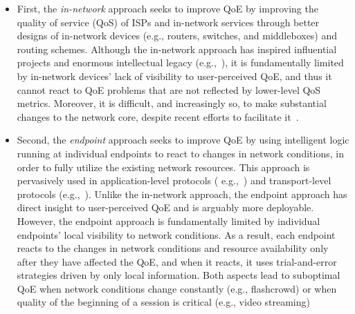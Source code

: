 \begin{itemize}
\item First, the {\em in-network} approach seeks to improve QoE by improving
the quality of service (QoS) of ISPs and in-network services through better designs 
of in-network devices (e.g., routers, switches, and middleboxes) and routing schemes.
Although the  in-network approach has inspired influential projects and 
enormous intellectual legacy (e.g.,~\cite{demers1989analysis,csfq,active-network,red,ecn,ccn}),
it is fundamentally limited by in-network devices' lack of visibility to user-perceived QoE,
and thus it cannot react to QoE problems that are not reflected by lower-level QoS metrics.
Moreover, it is difficult, and increasingly so, to make substantial changes 
to the network core, despite recent efforts to facilitate it~\cite{feamster2014road}.

\item Second, the {\em endpoint} approach seeks to improve QoE by using
intelligent logic running at individual endpoints to react to changes in
network conditions, in order to fully utilize the existing network resources.
This approach is pervasively used in application-level protocols (
e.g.,~\cite{dash,festive,butkiewicz2015klotski,diversifi,sprout})
and transport-level protocols (e.g.,~\cite{jacobson1988congestion,cubic,remy,pcc}).
Unlike the in-network approach, the endpoint approach has direct insight to user-perceived 
QoE and is arguably more deployable.
However, the endpoint approach is fundamentally limited by 
individual endpoints' local visibility to network conditions.
As a result, each endpoint reacts to the changes in network conditions and 
resource availability only after they have affected the QoE,
and when it reacts, it uses trial-and-error strategies driven by only local information.
Both aspects lead to suboptimal QoE when network conditions change constantly 
(e.g., flashcrowd) or when quality of the beginning of a session is critical (e.g., video streaming)


\end{itemize}
